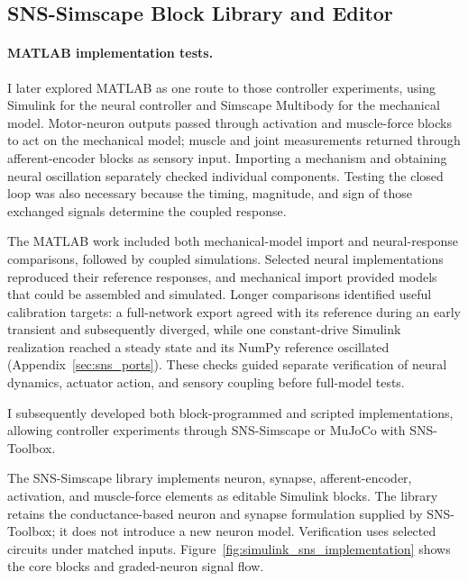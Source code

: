 \FloatBarrier

\subsection{SNS-Simscape Block Library and Editor}\label{sec:sns_new_tools}\label{sec:sns_simulink_demos}

\paragraph{MATLAB implementation tests.}\label{sec:w2l_matlab_attempt}

I later explored MATLAB as one route to those controller experiments, using Simulink for the neural controller and Simscape Multibody for the mechanical model. Motor-neuron outputs passed through activation and muscle-force blocks to act on the mechanical model; muscle and joint measurements returned through afferent-encoder blocks as sensory input. Importing a mechanism and obtaining neural oscillation separately checked individual components. Testing the closed loop was also necessary because the timing, magnitude, and sign of those exchanged signals determine the coupled response.

The MATLAB work included both mechanical-model import and neural-response comparisons, followed by coupled simulations. Selected neural implementations reproduced their reference responses, and mechanical import provided models that could be assembled and simulated. Longer comparisons identified useful calibration targets: a full-network export agreed with its reference during an early transient and subsequently diverged, while one constant-drive Simulink realization reached a steady state and its NumPy reference oscillated (Appendix~\ref{sec:sns_ports}). These checks guided separate verification of neural dynamics, actuator action, and sensory coupling before full-model tests.

I subsequently developed both block-programmed and scripted implementations, allowing controller experiments through SNS-Simscape or MuJoCo with SNS-Toolbox.

The SNS-Simscape library implements neuron, synapse, afferent-encoder, activation, and muscle-force elements as editable Simulink blocks. The library retains the conductance-based neuron and synapse formulation supplied by SNS-Toolbox; it does not introduce a new neuron model. Verification uses selected circuits under matched inputs. Figure~\ref{fig:simulink_sns_implementation} shows the core blocks and graded-neuron signal flow.

